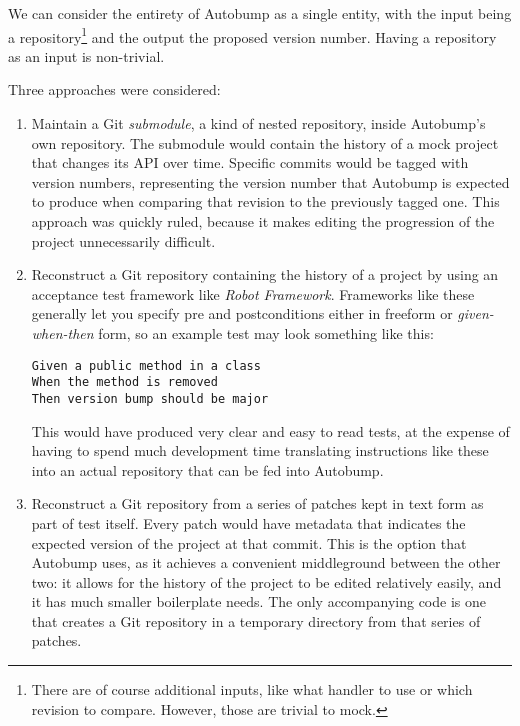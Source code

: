 \documentclass{l4proj}
\begin{document}
We can consider the entirety of Autobump as a single entity, with the
input being a repository\footnote{There are of course additional
inputs, like what handler to use or which revision to compare.
However, those are trivial to mock.} and the output the proposed
version number. Having a repository as an input is non-trivial.

Three approaches were considered:
\begin{enumerate}
\item Maintain a Git \textit{submodule}, a kind of nested repository,
inside Autobump's own repository. The submodule would contain the
history of a mock project that changes its API over time. Specific
commits would be tagged with version numbers, representing the version
number that Autobump is expected to produce when comparing that
revision to the previously tagged one. This approach was quickly
ruled, because it makes editing the progression of the project
unnecessarily difficult.
\item Reconstruct a Git repository containing the history of a project
by using an acceptance test framework like \textit{Robot
Framework}\cite{Robot}. Frameworks like these generally let you
specify pre and postconditions either in freeform or
\textit{given-when-then} form, so an example test may look something
like this:

\begin{center}
\begin{BVerbatim}
Given a public method in a class
When the method is removed
Then version bump should be major
\end{BVerbatim}
\end{center}

This would have produced very clear and easy to read tests, at the
expense of having to spend much development time translating
instructions like these into an actual repository that can be fed into Autobump.
\item Reconstruct a Git repository from a series of patches kept in
text form as part of test itself. Every patch would have metadata that
indicates the expected version of the project at that commit. This is
the option that Autobump uses, as it achieves a convenient
middleground between the other two: it allows for the history of the
project to be edited relatively easily, and it has much smaller
boilerplate needs. The only accompanying code is one that creates a
Git repository in a temporary directory from that series of patches.
\end{enumerate}
\end{document}
